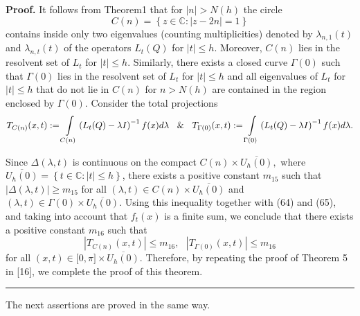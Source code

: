 \documentclass{article}%
\newenvironment{proof}[1][Proof]{\textbf{#1.} }{\ \rule{0.5em}{0.5em}}
\begin{document}
\begin{proof}
It follows from Theorem1 that for $\left\vert n\right\vert >N(h)$ the circle
\[
C(n)=\left\{  z\in\mathbb{C}:\left\vert z-2n\right\vert =1\right\}
\]
contains inside only two eigenvalues (counting multiplicities) denoted by
$\lambda_{n,1}(t)$ and $\lambda_{n,t}(t)$ of the operators $L_{t}(Q)$ for
$|t|\leq h$. Moreover, $C(n)$ lies in the resolvent set of $L_{t}$ for
$|t|\leq h.$ Similarly, there exists a closed curve $\Gamma(0)$ such that
$\Gamma(0)$ lies in the resolvent set of $L_{t}$ for $|t|\leq h$ and all
eigenvalues of $L_{t}$ for $|t|\leq h$ that do not lie in $C(n)$ for $n>N(h)$
are contained in the region enclosed by $\Gamma(0).$ Consider the total
projections
\[
T_{C(n)}(x,t):=\int\limits_{C(n)}\left(  L_{t}(Q)-\lambda I\right)
^{-1}f(x)d\lambda\text{ }\And\text{ }T_{\Gamma(0)}(x,t):=\int\limits_{\Gamma
(0)}\left(  L_{t}(Q)-\lambda I\right)  ^{-1}f(x)d\lambda.
\]


Since $\Delta(\lambda,t)$ is continuous on the compact $C(n)\times
\overline{U_{h}(0)},$ where $\overline{U_{h}(0)}=\left\{  t\in\mathbb{C}%
:\left\vert t\right\vert \leq h\right\}  $, there exists a positive constant
$m_{15}$ such that $\left\vert \Delta(\lambda,t)\right\vert \geq m_{15}$ for
all $(\lambda,t)\in C(n)\times\overline{U_{h}(0)}$ and $(\lambda,t)\in
\Gamma(0)\times\overline{U_{h}(0)}.$ Using this inequality together with (64)
and (65), and taking into account that $f_{t}(x)$ is a finite sum, we conclude
that there exists a positive constant $m_{16}$ such that
\begin{equation}
\left\vert T_{C(n)}(x,t)\right\vert \leq m_{16},\text{ }\left\vert
T_{\Gamma(0)}(x,t)\right\vert \leq m_{16} \tag{70}%
\end{equation}
for all $(x,t)\in\lbrack0,\pi]\times\overline{U_{h}(0)}.$ Therefore, by
repeating the proof of Theorem 5 in [16], we complete the proof of this theorem.
\end{proof}

The next assertions are proved in the same way.
\end{document}
